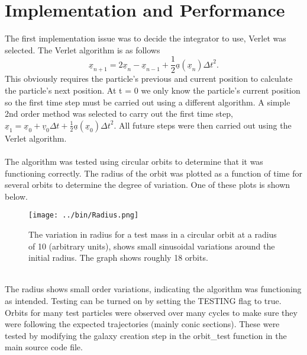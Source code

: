 \documentclass[10pt,a4paper]{article}
\begin{document}
\section{Implementation and Performance}
The first implementation issue was to decide the integrator to use, Verlet was selected. The Verlet algorithm is as follows 
\begin{equation}
	\underline{x}_{n+1} = 2 \underline{x}_n - \underline{x}_{n-1} + \frac{1}{2}  \underline{a}(\underline{x}_n) {\Delta t }^ 2 .
\end{equation}  
This obviously requires the particle's previous and current position to calculate the particle's next position. At t = 0 we only know the particle's current position so the first time step must be carried out using a different algorithm. A simple 2nd order method was selected to carry out the first time step, $\underline{x}_{1} =  \underline{x}_0 + \underline{v}_0 {\Delta t} + \frac{1}{2}  \underline{a}(\underline{x}_0) {\Delta t }^ 2 .$ All future steps were then carried out using the Verlet algorithm.
\\
\\
The algorithm was tested using circular orbits to determine that it was functioning correctly. The radius of the orbit was plotted as a function of time for several orbits to determine the degree of variation. One of these plots is shown below.
\begin{figure}[ht!]
\centering
\texttt{[image: ../bin/Radius.png]}
\caption{The variation in radius for a test mass in a circular orbit at a radius of 10 (arbitrary units), shows small sinusoidal variations around the initial radius. The graph shows roughly 18 orbits.
\label{radiusfig}}
\end{figure}
\\
The radius shows small order variations, indicating the algorithm was functioning as intended. Testing can be turned on by setting the TESTING flag to true. Orbits for many test particles were observed over many cycles to make sure they were following the expected trajectories (mainly conic sections). These were tested by modifying the galaxy creation step in the orbit\_test function in the main source code file.
\\
\\
\end{document}
